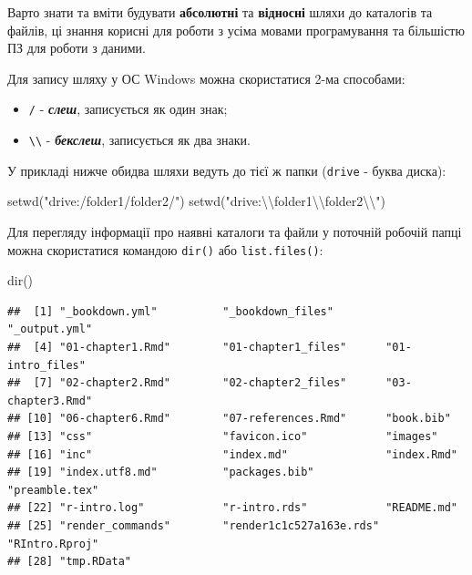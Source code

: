 \documentclass[
]{book}
\newenvironment{Shaded}{\begin{snugshade}}{\end{snugshade}}
\newcommand{\FunctionTok}[1]{\textcolor[rgb]{0.00,0.00,0.00}{#1}}
\newcommand{\NormalTok}[1]{#1}
\newcommand{\SpecialCharTok}[1]{\textcolor[rgb]{0.00,0.00,0.00}{#1}}
\newcommand{\StringTok}[1]{\textcolor[rgb]{0.31,0.60,0.02}{#1}}
\providecommand{\tightlist}{%
  \setlength{\itemsep}{0pt}\setlength{\parskip}{0pt}}
\begin{document}
Варто знати та вміти будувати \textbf{абсолютні} та \textbf{відносні} шляхи до каталогів та файлів, ці знання корисні для роботи з усіма мовами програмування та більшістю ПЗ для роботи з даними.

Для запису шляху у ОС Windows можна скористатися 2-ма способами:

\begin{itemize}
\tightlist
\item
  \texttt{/} - \textbf{\emph{слеш}}, записується як один знак;
\item
  \texttt{\textbackslash{}\textbackslash{}} - \textbf{\emph{бекслеш}}, записується як два знаки.
\end{itemize}

У прикладі нижче обидва шляхи ведуть до тієї ж папки (\texttt{drive} - буква диска):

\begin{Shaded}
\begin{Highlighting}[]
\FunctionTok{setwd}\NormalTok{(}\StringTok{"drive:/folder1/folder2/"}\NormalTok{)}
\FunctionTok{setwd}\NormalTok{(}\StringTok{"drive:}\SpecialCharTok{\textbackslash{}\textbackslash{}}\StringTok{folder1}\SpecialCharTok{\textbackslash{}\textbackslash{}}\StringTok{folder2}\SpecialCharTok{\textbackslash{}\textbackslash{}}\StringTok{"}\NormalTok{)}
\end{Highlighting}
\end{Shaded}

Для перегляду інформації про наявні каталоги та файли у поточній робочій папці можна скористатися командою \texttt{dir()} або \texttt{list.files()}:

\begin{Shaded}
\begin{Highlighting}[]
\FunctionTok{dir}\NormalTok{()}
\end{Highlighting}
\end{Shaded}

\begin{verbatim}
##  [1] "_bookdown.yml"          "_bookdown_files"        "_output.yml"           
##  [4] "01-chapter1.Rmd"        "01-chapter1_files"      "01-intro_files"        
##  [7] "02-chapter2.Rmd"        "02-chapter2_files"      "03-chapter3.Rmd"       
## [10] "06-chapter6.Rmd"        "07-references.Rmd"      "book.bib"              
## [13] "css"                    "favicon.ico"            "images"                
## [16] "inc"                    "index.md"               "index.Rmd"             
## [19] "index.utf8.md"          "packages.bib"           "preamble.tex"          
## [22] "r-intro.log"            "r-intro.rds"            "README.md"             
## [25] "render_commands"        "render1c1c527a163e.rds" "RIntro.Rproj"          
## [28] "tmp.RData"
\end{verbatim}
\end{document}
